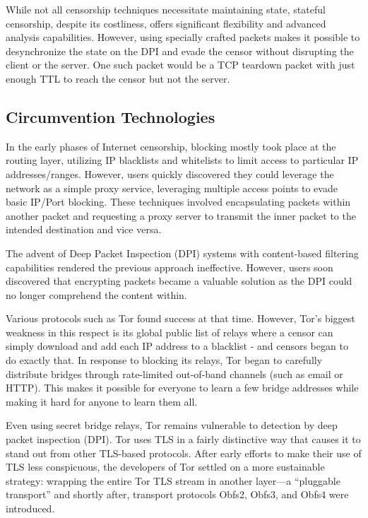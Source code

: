 While not all censorship techniques necessitate maintaining state, stateful censorship, despite its costliness, offers significant flexibility and advanced analysis capabilities. However, using specially crafted packets makes it possible to desynchronize the state on the DPI and evade the censor without disrupting the client or the server. One such packet would be a TCP teardown packet with just enough TTL to reach the censor but not the server.

\subsection{Circumvention Technologies}
In the early phases of Internet censorship, blocking mostly took place at the routing layer, utilizing IP blacklists and whitelists to limit access to particular IP addresses/ranges. However, users quickly discovered they could leverage the network as a simple proxy service, leveraging multiple access points to evade basic IP/Port blocking. These techniques involved encapsulating packets within another packet and requesting a proxy server to transmit the inner packet to the intended destination and vice versa.

The advent of Deep Packet Inspection (DPI) systems with content-based filtering capabilities rendered the previous approach ineffective. However, users soon discovered that encrypting packets became a valuable solution as the DPI could no longer comprehend the content within.\cite{leberknight2010taxonomy}

Various protocols such as Tor found success at that time. However, Tor’s biggest weakness in this respect is its global public list of relays where a censor can simply download and add each IP address to a blacklist - and censors began to do exactly that. In response to blocking its relays, Tor began to carefully distribute bridges through rate-limited out-of-band channels (such as email or HTTP). This makes it possible for everyone to learn a few bridge addresses while making it hard for anyone to learn them all.

Even using secret bridge relays, Tor remains vulnerable to detection by deep packet inspection (DPI). Tor uses TLS in a fairly distinctive way that causes it to stand out from other TLS-based protocols. After early efforts to make their use of TLS less conspicuous, the developers of Tor settled on a more sustainable strategy: wrapping the entire Tor TLS stream in another layer—a “pluggable transport” and shortly after, transport protocols Obfs2, Obfs3, and Obfs4 were introduced.\cite{ensafi2015firewall}

